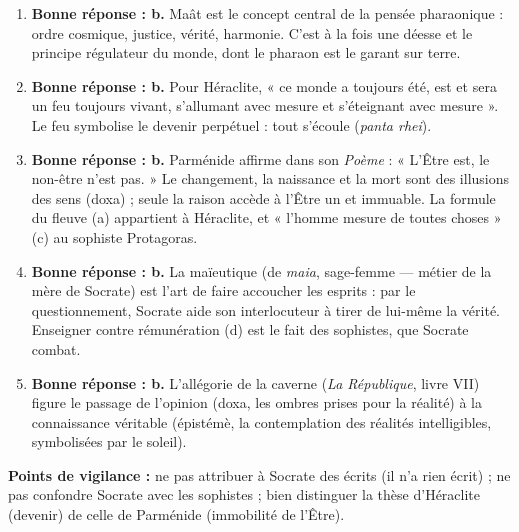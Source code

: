 \documentclass[11pt]{article}
\newcommand{\cle}[1]{{\popxbold\color{popdark}#1}}
\begin{document}
\begin{corrige}
\begin{enumerate}
\item \textbf{Bonne réponse : b.} \cle{Maât} est le concept central de la pensée pharaonique : ordre cosmique, justice, vérité, harmonie. C'est à la fois une déesse et le principe régulateur du monde, dont le pharaon est le garant sur terre.
\item \textbf{Bonne réponse : b.} Pour Héraclite, « ce monde a toujours été, est et sera un feu toujours vivant, s'allumant avec mesure et s'éteignant avec mesure ». Le feu symbolise le \cle{devenir} perpétuel : tout s'écoule (\emph{panta rhei}).
\item \textbf{Bonne réponse : b.} Parménide affirme dans son \emph{Poème} : « L'Être est, le non-être n'est pas. » Le changement, la naissance et la mort sont des illusions des sens (\cle{doxa}) ; seule la raison accède à l'Être un et immuable. La formule du fleuve (a) appartient à Héraclite, et « l'homme mesure de toutes choses » (c) au sophiste Protagoras.
\item \textbf{Bonne réponse : b.} La \cle{maïeutique} (de \emph{maia}, sage-femme — métier de la mère de Socrate) est l'art de faire accoucher les esprits : par le questionnement, Socrate aide son interlocuteur à tirer de lui-même la vérité. Enseigner contre rémunération (d) est le fait des sophistes, que Socrate combat.
\item \textbf{Bonne réponse : b.} L'allégorie de la caverne (\emph{La République}, livre VII) figure le passage de l'opinion (\cle{doxa}, les ombres prises pour la réalité) à la connaissance véritable (\cle{épistémè}, la contemplation des réalités intelligibles, symbolisées par le soleil).
\end{enumerate}
\textbf{Points de vigilance :} ne pas attribuer à Socrate des écrits (il n'a rien écrit) ; ne pas confondre Socrate avec les sophistes ; bien distinguer la thèse d'Héraclite (devenir) de celle de Parménide (immobilité de l'Être).
\end{corrige}
\end{document}
